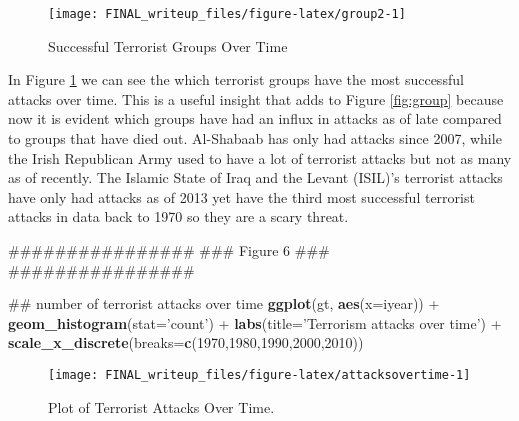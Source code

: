 \documentclass[11pt,letterpaper,]{article}
\newenvironment{Shaded}{\begin{snugshade}}{\end{snugshade}}
\newcommand{\KeywordTok}[1]{\textcolor[rgb]{0.13,0.29,0.53}{\textbf{{#1}}}}
\newcommand{\DataTypeTok}[1]{\textcolor[rgb]{0.13,0.29,0.53}{{#1}}}
\newcommand{\DecValTok}[1]{\textcolor[rgb]{0.00,0.00,0.81}{{#1}}}
\newcommand{\StringTok}[1]{\textcolor[rgb]{0.31,0.60,0.02}{{#1}}}
\newcommand{\NormalTok}[1]{{#1}}
\theoremstyle{definition}
\theoremstyle{definition}
\theoremstyle{definition}
\theoremstyle{remark}
\begin{document}
\begin{figure}

{\centering \texttt{[image: FINAL\_writeup\_files/figure-latex/group2-1]} 

}

\caption{Successful Terrorist Groups Over Time}\label{fig:group2}
\end{figure}

In Figure \ref{fig:group2} we can see the which terrorist groups have
the most successful attacks over time. This is a useful insight that
adds to Figure \ref{fig:group} because now it is evident which groups
have had an influx in attacks as of late compared to groups that have
died out. Al-Shabaab has only had attacks since 2007, while the Irish
Republican Army used to have a lot of terrorist attacks but not as many
as of recently. The Islamic State of Iraq and the Levant (ISIL)'s
terrorist attacks have only had attacks as of 2013 yet have the third
most successful terrorist attacks in data back to 1970 so they are a
scary threat.



\begin{Shaded}
\begin{Highlighting}[]
\NormalTok{################}
\NormalTok{### Figure 6 ###}
\NormalTok{################}


\NormalTok{## number of terrorist attacks over time}
\KeywordTok{ggplot}\NormalTok{(gt, }\KeywordTok{aes}\NormalTok{(}\DataTypeTok{x=}\NormalTok{iyear)) +}
\StringTok{  }\KeywordTok{geom_histogram}\NormalTok{(}\DataTypeTok{stat=}\StringTok{'count'}\NormalTok{) +}
\StringTok{  }\KeywordTok{labs}\NormalTok{(}\DataTypeTok{title=}\StringTok{'Terrorism attacks over time'}\NormalTok{) +}
\StringTok{  }\KeywordTok{scale_x_discrete}\NormalTok{(}\DataTypeTok{breaks=}\KeywordTok{c}\NormalTok{(}\DecValTok{1970}\NormalTok{,}\DecValTok{1980}\NormalTok{,}\DecValTok{1990}\NormalTok{,}\DecValTok{2000}\NormalTok{,}\DecValTok{2010}\NormalTok{))}
\end{Highlighting}
\end{Shaded}

\begin{figure}

{\centering \texttt{[image: FINAL\_writeup\_files/figure-latex/attacksovertime-1]} 

}

\caption{Plot of Terrorist Attacks Over Time.}\label{fig:attacksovertime}
\end{figure}
\end{document}
